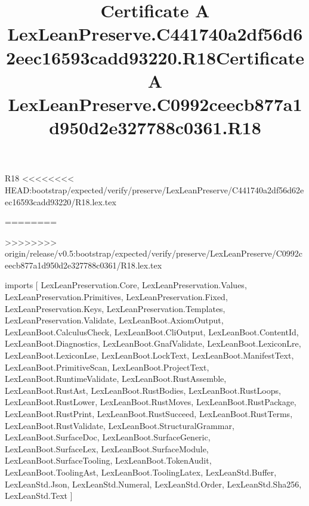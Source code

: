 \begin{lexlean}{R18}
<<<<<<<< HEAD:bootstrap/expected/verify/preserve/LexLeanPreserve/C441740a2df56d62eec16593cadd93220/R18.lex.tex
\title{Certificate A LexLeanPreserve.C441740a2df56d62eec16593cadd93220.R18}
========
\title{Certificate A LexLeanPreserve.C0992ceecb877a1d950d2e327788c0361.R18}
>>>>>>>> origin/release/v0.5:bootstrap/expected/verify/preserve/LexLeanPreserve/C0992ceecb877a1d950d2e327788c0361/R18.lex.tex
\begin{coremodule}
imports [
  LexLeanPreservation.Core,
  LexLeanPreservation.Values,
  LexLeanPreservation.Primitives,
  LexLeanPreservation.Fixed,
  LexLeanPreservation.Keys,
  LexLeanPreservation.Templates,
  LexLeanPreservation.Validate,
  LexLeanBoot.AxiomOutput,
  LexLeanBoot.CalculusCheck,
  LexLeanBoot.CliOutput,
  LexLeanBoot.ContentId,
  LexLeanBoot.Diagnostics,
  LexLeanBoot.GnafValidate,
  LexLeanBoot.LexiconLre,
  LexLeanBoot.LexiconLse,
  LexLeanBoot.LockText,
  LexLeanBoot.ManifestText,
  LexLeanBoot.PrimitiveScan,
  LexLeanBoot.ProjectText,
  LexLeanBoot.RuntimeValidate,
  LexLeanBoot.RustAssemble,
  LexLeanBoot.RustAst,
  LexLeanBoot.RustBodies,
  LexLeanBoot.RustLoops,
  LexLeanBoot.RustLower,
  LexLeanBoot.RustMoves,
  LexLeanBoot.RustPackage,
  LexLeanBoot.RustPrint,
  LexLeanBoot.RustSucceed,
  LexLeanBoot.RustTerms,
  LexLeanBoot.RustValidate,
  LexLeanBoot.StructuralGrammar,
  LexLeanBoot.SurfaceDoc,
  LexLeanBoot.SurfaceGeneric,
  LexLeanBoot.SurfaceLex,
  LexLeanBoot.SurfaceModule,
  LexLeanBoot.SurfaceTooling,
  LexLeanBoot.TokenAudit,
  LexLeanBoot.ToolingAst,
  LexLeanBoot.ToolingLatex,
  LexLeanStd.Buffer,
  LexLeanStd.Json,
  LexLeanStd.Numeral,
  LexLeanStd.Order,
  LexLeanStd.Sha256,
  LexLeanStd.Text
]


\end{coremodule}
\end{lexlean}
